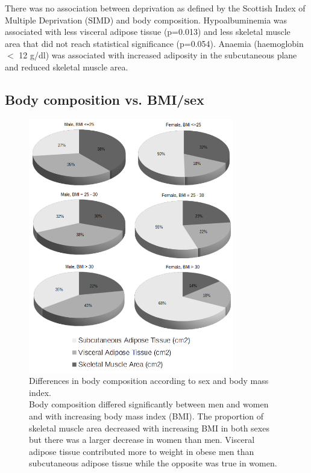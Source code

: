 There was no association between deprivation as defined by the Scottish Index of Multiple Deprivation (SIMD) and body composition.
Hypoalbuminemia was associated with less visceral adipose tissue (p=0.013) and less skeletal muscle area that did not reach statistical significance (p=0.054). 
Anaemia (haemoglobin $<$ 12 g/dl) was associated with increased adiposity in the subcutaneous plane and reduced skeletal muscle area. 
	
\clearpage

\subsection{Body composition vs. BMI/sex}

\begin{figure}[htb]
	\centering
	\includegraphics[width=0.8\textwidth]{Figures/bc_gender_bmi_pie}
	\caption[Differences in body composition according to sex and body mass index.]
	{Differences in body composition according to sex and body mass index.
		\\Body composition differed significantly between men and women and with increasing body mass index (BMI). The proportion of skeletal muscle area decreased with increasing BMI in both sexes but there was a larger decrease in women than men. Visceral adipose tissue contributed more to weight in obese men than subcutaneous adipose tissue while the opposite was true in women.}
	\label{fig:bc_gender_bmi}
\end{figure}

